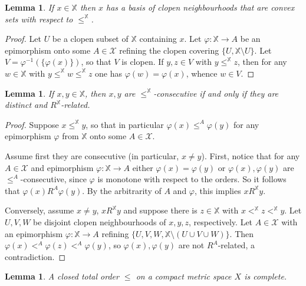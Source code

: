 \documentclass[12pt,twoside,a4paper]{amsart}
\theoremstyle{plain}
\newtheorem{lemma}[theorem]{Lemma}
\theoremstyle{definition}
\begin{document}
\begin{lemma} \label{antervajbomba}
If $x\in \mathbb X $ then $x$ has a basis of clopen neighbourhoods that are convex sets with respect to $\leq^{ \mathbb X }$.
\end{lemma}

\begin{proof}
Let $U$ be a clopen subset of $ \mathbb X $ containing $x$.
Let $ {\varphi} : \mathbb X \to A$ be an epimorphism onto some $A\in \mathcal X $ refining the clopen covering $\{ U, \mathbb X \setminus U\} $.
Let $V= {\varphi}^{-1}(\{ {\varphi} (x)\} )$, so that $V$ is clopen.
If $y,z\in V$ with $y\leq^{ \mathbb X }z$, then for any $w\in \mathbb X $ with $y\leq^{ \mathbb X }w\leq^{ \mathbb X }z$ one has $ {\varphi} (w)= {\varphi} (x)$, whence $w\in V$.
\end{proof}

\begin{lemma} \label{consecutiv}
If $x,y\in \mathbb X $, then $x,y$ are $\leq^{ \mathbb X }$-consecutive if and only if they are distinct and $R^{ \mathbb X }$-related.
\end{lemma}

\begin{proof}
Suppose $x\leq^{ \mathbb X }y$, so that in particular $ {\varphi} (x)\leq^A {\varphi} (y)$ for any epimorphism $ {\varphi} $ from $ \mathbb X $ onto some $A\in \mathcal X $.

Assume first they are consecutive (in particular, $x\neq y$).
First, notice that for any $A\in \mathcal X $ and epimorphism $ {\varphi} : \mathbb X \to A$ either $ {\varphi} (x)= {\varphi} (y)$ or $ {\varphi} (x), {\varphi} (y)$ are $\leq^A$-consecutive, since $ {\varphi} $ is monotone with respect to the orders.
So it follows that $ {\varphi} (x)R^A {\varphi} (y)$.
By the arbitrarity of $A$ and $ {\varphi} $, this implies $xR^{ \mathbb X }y$.

Conversely, assume $x\neq y$, $xR^{ \mathbb X }y$ and suppose there is $z\in \mathbb X $ with $x<^{ \mathbb X }z<^{ \mathbb X }y$.
Let $U,V,W$ be disjoint clopen neighbourhoods of $x,y,z$, respectively.
Let $A\in \mathcal X$ with an epimorphism $ {\varphi} : \mathbb X \to A$ refining $\{ U,V,W, \mathbb X \setminus (U\cup V\cup W)\} $.
Then $ {\varphi} (x)<^A {\varphi} (z)<^A {\varphi} (y)$, so $ {\varphi} (x), {\varphi} (y)$ are not $R^A$-related, a contradiction.
\end{proof}

\begin{lemma} \label{ordincomplet}
A closed total order $\leq $ on a compact metric space $X$ is complete.
\end{lemma}
\end{document}
